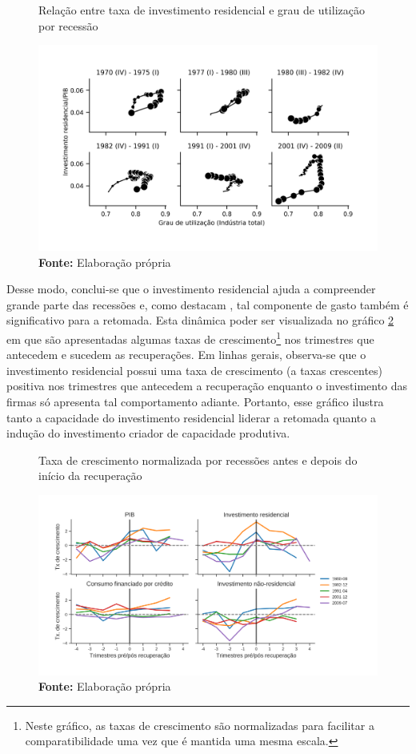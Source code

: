 
\begin{figure}[htb]
	\centering
	\caption{Relação entre taxa de investimento residencial e grau de utilização por recessão}
	\label{Investo_Resid}
	\includegraphics[width=\textwidth]{Fatos_Estilizados/Figs/Empiria.png}
	\caption*{\textbf{Fonte:} Elaboração própria}
\end{figure}

Desse modo, conclui-se que o investimento residencial ajuda a compreender grande parte das recessões e, como destacam \textcite{arestis_residential_2015}, tal componente de gasto também é significativo para a retomada. Esta dinâmica poder ser visualizada no gráfico \ref{Recuperacao} em que são apresentadas algumas taxas de crescimento\footnote{Neste gráfico, as taxas de crescimento são normalizadas para facilitar a comparatibilidade uma vez que é mantida uma mesma escala.} nos trimestres que antecedem e sucedem as recuperações. Em linhas gerais, observa-se que o investimento residencial possui uma taxa de crescimento (a taxas crescentes) positiva nos trimestres que antecedem a recuperação enquanto o investimento das firmas só apresenta tal comportamento adiante. Portanto, esse gráfico ilustra tanto a capacidade do investimento residencial liderar a retomada quanto a indução do investimento criador de capacidade produtiva.

\begin{figure}[htb]
	\centering
	\caption{Taxa de crescimento normalizada por recessões antes e depois do início da recuperação}
	\label{Recuperacao}
	\includegraphics[width=\textwidth]{Fatos_Estilizados/Figs/Recuperacao.png}
	\caption*{\textbf{Fonte:} Elaboração própria}
\end{figure}

